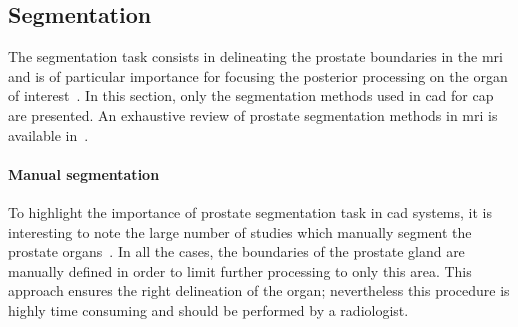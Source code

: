 \subsection{Segmentation}\label{subsec:chp3:img-reg:seg}
The segmentation task consists in delineating the prostate boundaries in the \ac{mri} and is of particular importance for focusing the posterior processing on the organ of interest~\cite{Ghose2012}. 
In this section, only the segmentation methods used in \ac{cad} for \ac{cap} are presented.
An exhaustive review of prostate segmentation methods in \ac{mri} is available in~\cite{Ghose2012}.


\paragraph{Manual segmentation}
To highlight the importance of prostate segmentation task in \ac{cad} systems, it is interesting to note the large number of studies which manually segment the prostate organs~\cite{Artan2009,Artan2010,Matulewicz2013,Niaf2011,Niaf2012,Ozer2009,Ozer2010,Puech2009,Vos2008,Vos2008a,trigui2016classification,trigui2017automatic,lehaire2014computer}.
In all the cases, the boundaries of the prostate gland are manually defined in order to limit further processing to only this area.
This approach ensures the right delineation of the organ; nevertheless this procedure is highly time consuming and should be performed by a radiologist.

